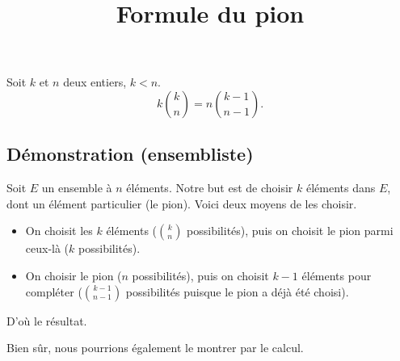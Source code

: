 \documentclass[fontsize=12pt,twoside=false,parskip=half, french]{scrartcl}
\title{Formule du pion}
\date{}
\author{}
\begin{document}
\maketitle
   \begin{Theoreme}
      Soit $k$ et $n$ deux entiers, $k < n$. 
      \[
         k\binom{k}{n} = n\binom{k - 1}{n - 1}.
      \]
   \end{Theoreme}
   \subsection{Démonstration (ensembliste)}
      Soit $E$ un ensemble à $n$ éléments.  Notre but est de choisir $k$ éléments
      dans $E$, dont un élément particulier (le pion). Voici deux moyens de les
      choisir.
      \begin{itemize}
         \item On choisit les $k$ éléments ($\binom{k}{n}$ possibilités), puis
               on choisit le pion parmi ceux-là ($k$ possibilités).
         \item On choisir le pion ($n$ possibilités), puis on choisit $k - 1$
               éléments pour compléter ($\binom{k - 1}{n - 1}$ possibilités 
               puisque le pion a déjà été choisi).
      \end{itemize}
      D'où le résultat.
      
      Bien sûr, nous pourrions également le montrer par le calcul.
\end{document}
